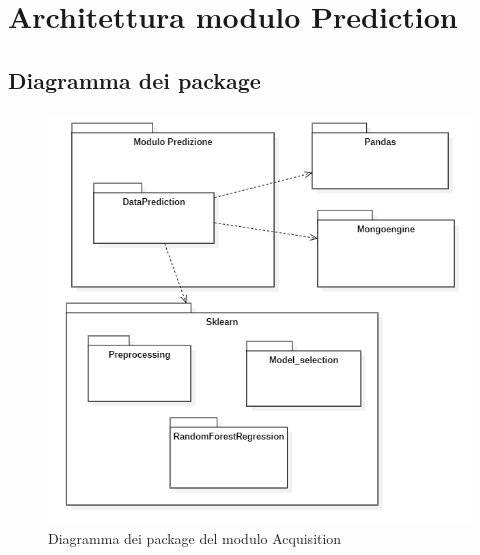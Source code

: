 \section{Architettura modulo Prediction}
\subsection{Diagramma dei package}
\begin{figure}[!h]
  \begin{center}
    \includegraphics[width=1\linewidth]{../immagini/diag_PB/diag_pack_pred.png}
    \caption{Diagramma dei package del modulo Acquisition}
  \end{center}
\end{figure}

